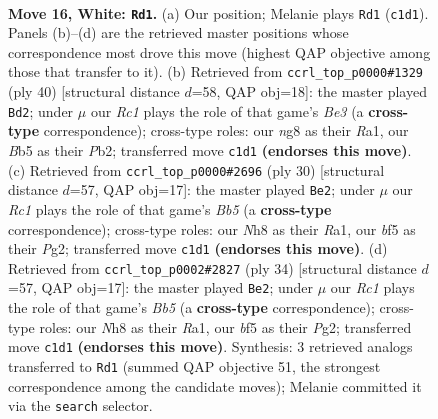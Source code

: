\documentclass[11pt]{article}
\begin{document}
\clearpage

\begin{figure}[p]\centering
\begin{subfigure}{0.46\textwidth}\centering
\resizebox{\linewidth}{!}{%
\newchessgame
\chessboard[
  setfen={rnk3nN/pp5p/4p3/1B1p1bp1/3p4/b7/P1P2PPP/2R1K2R w K - 0 16},
  showmover=false,
  pgfstyle=straightmove, color=movearrow, markmove={c1-d1}
]}
\caption{}
\end{subfigure}\hfill
\begin{subfigure}{0.46\textwidth}\centering
\resizebox{\linewidth}{!}{%
\newchessgame
\chessboard[
  setfen={n1b2b1r/pp3k1p/2p3p1/4p3/3p4/4B3/PPP1BPPP/R3K2R w KQ - 0 21},
  showmover=false,
  pgfstyle=straightmove, color=movearrow, markmove={e3-d2}
]}
\caption{}
\end{subfigure}
\\[4pt]
\begin{subfigure}{0.46\textwidth}\centering
\resizebox{\linewidth}{!}{%
\newchessgame
\chessboard[
  setfen={n1b2b1r/pp2pk1p/2pp2p1/1B6/8/8/PPP2PPP/R1B1K2R w KQ - 0 16},
  showmover=false,
  pgfstyle=straightmove, color=movearrow, markmove={b5-e2}
]}
\caption{}
\end{subfigure}\hfill
\begin{subfigure}{0.46\textwidth}\centering
\resizebox{\linewidth}{!}{%
\newchessgame
\chessboard[
  setfen={n1b2b1r/pp2pk1p/2pp2p1/1B6/8/8/PPP2PPP/R1B1K2R w KQ - 0 18},
  showmover=false,
  pgfstyle=straightmove, color=movearrow, markmove={b5-e2}
]}
\caption{}
\end{subfigure}
\caption{\textbf{Move 16, White: \texttt{Rd1}.} (a) Our position; Melanie plays \texttt{Rd1} (\texttt{c1d1}). Panels (b)--(d) are the retrieved master positions whose correspondence most drove this move (highest QAP objective among those that transfer to it). (b) Retrieved from \texttt{ccrl\_top\_p0000\#1329} (ply 40) [structural distance $d$=58, QAP obj=18]: the master played \texttt{Bd2}; under $\mu$ our \emph{Rc1} plays the role of that game's \emph{Be3} (a \textbf{cross-type} correspondence); cross-type roles: our \emph{n}g8 as their \emph{R}a1, our \emph{B}b5 as their \emph{P}b2; transferred move \texttt{c1d1} \textbf{(endorses this move)}. (c) Retrieved from \texttt{ccrl\_top\_p0000\#2696} (ply 30) [structural distance $d$=57, QAP obj=17]: the master played \texttt{Be2}; under $\mu$ our \emph{Rc1} plays the role of that game's \emph{Bb5} (a \textbf{cross-type} correspondence); cross-type roles: our \emph{N}h8 as their \emph{R}a1, our \emph{b}f5 as their \emph{P}g2; transferred move \texttt{c1d1} \textbf{(endorses this move)}. (d) Retrieved from \texttt{ccrl\_top\_p0002\#2827} (ply 34) [structural distance $d$=57, QAP obj=17]: the master played \texttt{Be2}; under $\mu$ our \emph{Rc1} plays the role of that game's \emph{Bb5} (a \textbf{cross-type} correspondence); cross-type roles: our \emph{N}h8 as their \emph{R}a1, our \emph{b}f5 as their \emph{P}g2; transferred move \texttt{c1d1} \textbf{(endorses this move)}. Synthesis: 3 retrieved analogs transferred to \texttt{Rd1} (summed QAP objective 51, the strongest correspondence among the candidate moves); Melanie committed it via the \texttt{search} selector.}
\label{fig:thought-m30}
\end{figure}
\end{document}

